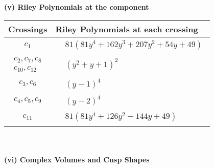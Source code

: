 \documentclass[1p]{elsarticle_modified}
\theoremstyle{definition}
\begin{document}
\newpage\renewcommand{\arraystretch}{1}
\flushleft \textbf{(v) Riley Polynomials at the component}\newline \\
\begin{tabular}{m{50pt}|m{274pt}}
Crossings & \hspace{64pt}Riley Polynomials at each crossing \\
\hline $$\begin{aligned}c_{1}\end{aligned}$$&$\begin{aligned}
&81(81 y^4+162 y^3+207 y^2+54 y+49)
\end{aligned}$\\
\hline $$\begin{aligned}c_{2},c_{7},c_{8}\\c_{10},c_{12}\end{aligned}$$&$\begin{aligned}
&(y^2+y+1)^2
\end{aligned}$\\
\hline $$\begin{aligned}c_{3},c_{6}\end{aligned}$$&$\begin{aligned}
&(y-1)^4
\end{aligned}$\\
\hline $$\begin{aligned}c_{4},c_{5},c_{9}\end{aligned}$$&$\begin{aligned}
&(y-2)^4
\end{aligned}$\\
\hline $$\begin{aligned}c_{11}\end{aligned}$$&$\begin{aligned}
&81(81 y^4+126 y^2-144 y+49)
\end{aligned}$\\
\hline
\end{tabular}\\~\\
\newpage\flushleft \textbf{(vi) Complex Volumes and Cusp Shapes}
\end{document}
